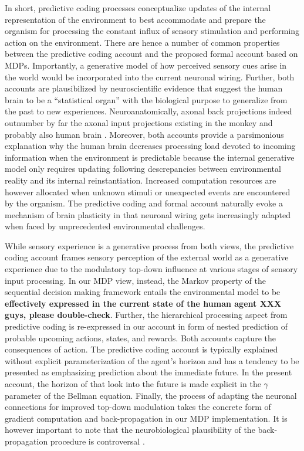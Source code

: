 \documentclass[10pt,letterpaper]{article}
\newcommand{\suggestremove}[1]{{\color{red} \sout{#1}}}
\begin{document}
In short, predictive coding processes
conceptualize updates of the internal representation of the environment
to best accommodate and prepare the organism
for processing the constant influx of sensory stimulation and
performing action on the environment.
There are hence a number of common properties
between the predictive coding account
and the proposed formal account based on MDPs.
Importantly,
a generative model of how perceived sensory cues arise in the
world would be incorporated into
the current neuronal wiring.
Further,
both accounts are plausibilized by neuroscientific evidence that suggest
the human brain to be a ``statistical organ'' \citep{friston2014phantastic}
with the biological purpose to
generalize from the past to new experiences.
Neuroanatomically, axonal
back projections indeed outnumber by far the axonal input projections
existing in the monkey and probably also human brain
\citep{salin1995corticocortical}.
Moreover,
both accounts provide a parsimonious explanation why the
human brain decreases processing load devoted to incoming information
when the environment is predictable because the internal generative
model only requires updating following descrepancies between
environmental reality and its internal reinstantiation.
Increased computation resources are however allocated
when unknown stimuli or
unexpected events are encountered by the organism.
The predictive coding and formal account
naturally evoke a mechanism of brain plasticity in that
neuronal wiring gets increasingly adapted
when faced by unprecedented environmental challenges.


While sensory experience is a generative process from both views,
the predictive coding account frames
sensory perception of the external world
as a generative experience due to the modulatory top-down influence at
various stages of sensory input processing.
In our MDP view, instead,
the Markov property of the sequential decision making framework entails
the environmental model to be
\textbf{effectively expressed in the current state of the human agent
XXX guys, please double-check}.
Further,
the hierarchical processing aspect from predictive coding
is re-expressed in our account in form of
nested prediction of probable upcoming actions, states, and rewards.
Both accounts capture the consequences of action.
The predictive coding account is typically explained without
explicit parameterization of the agent's horizon and
has a tendency to be presented as emphasizing prediction about the
immediate future.
In the present account, the horizon of that
look into the future is made explicit in the $\gamma$ parameter
of the Bellman equation.
Finally,
the process of adapting the neuronal connections
for improved top-down modulation
takes the concrete form of gradient computation and
back-propagation in our MDP implementation.
It is however important to note that
the neurobiological plausibility of
the back-propagation procedure is controversal
\citep{goodfellow2016deep}.
\end{document}

